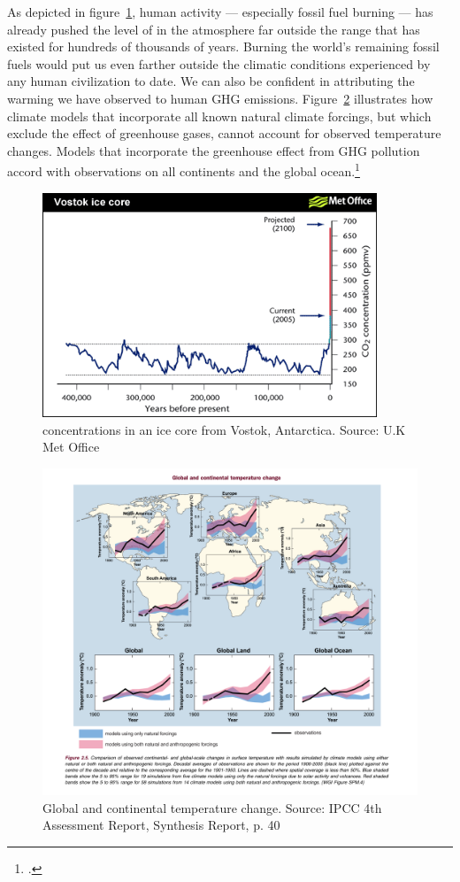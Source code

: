 As depicted in figure~\ref{fig:Vostok}, human activity --- especially fossil fuel burning --- has already pushed the level of  in the atmosphere  far outside the range that has existed for hundreds of thousands of years. Burning the world's remaining fossil fuels would put us even farther outside the climatic conditions experienced by any human civilization to date.
We can also be confident in attributing the warming we have observed to human GHG emissions.
Figure~\ref{fig:CO2increase} illustrates how climate models that incorporate all known natural climate forcings, but which exclude the effect of greenhouse gases, cannot account for observed temperature changes. 
Models that incorporate the greenhouse effect from GHG pollution accord with observations on all continents and the global ocean.\footcite[][]{IPCC2007}



\begin{figure}
\includegraphics[width=100mm]{s2-co2increase.png}
\centering
\caption{ concentrations in an ice core from Vostok, Antarctica. Source: U.K Met Office}
\label{fig:Vostok}
\end{figure}



\begin{figure}
\includegraphics[width=160mm]{s2-attribution.PNG}
\centering
\caption{Global and continental temperature change. Source: IPCC 4th Assessment Report, Synthesis Report, p. 40}
\label{fig:CO2increase}
\end{figure}



